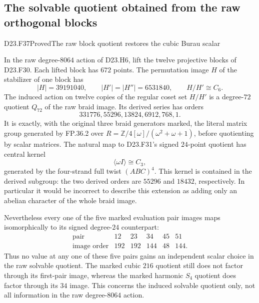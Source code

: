 \subsection{The solvable quotient obtained from the raw orthogonal blocks}

\begin{statement}{D23.F37}{Proved}{The raw block quotient restores the cubic Burau scalar}
\end{statement}
In the raw degree-$8064$ action of D23.H6, lift the twelve
projective blocks of D23.F30. Each lifted block has $672$ points.
The permutation image $H$ of the stabilizer of one block has
\[
 |H|=39191040,\qquad |H'|=|H''|=6531840,\qquad H/H'\cong C_6.
\]
The induced action on twelve copies of the regular coset set
$H/H'$ is a degree-$72$ quotient $Q_{72}$ of the raw braid image.
Its derived series has orders
\[
              331776,55296,13824,6912,768,1.
\]
It is exactly, with the original three braid generators marked,
the literal matrix group generated by FP.36.2 over
$R=\mathbb Z/4[\omega]/(\omega^2+\omega+1)$, before quotienting
by scalar matrices. The natural map to D23.F31's signed
$24$-point quotient has central kernel
\[
                      \langle\omega I\rangle\cong C_3,
\]
generated by the four-strand full twist $(ABC)^4$.
This kernel is contained in the derived subgroup: the two derived
orders are $55296$ and $18432$, respectively. In particular it
would be incorrect to describe this extension as adding only an
abelian character of the whole braid image.

Nevertheless every one of the five marked evaluation pair images
maps isomorphically to its signed degree-$24$ counterpart:
\[
\begin{array}{c|rrrrr}
\text{pair}&12&23&34&45&51\\\hline
\text{image order}&192&192&144&48&144.
\end{array}
\]
Thus no value at any one of these five pairs gains an independent
scalar choice in the raw solvable quotient. The marked cubic
$216$ quotient still does not factor through its first-pair image,
whereas the marked harmonic $S_4$ quotient does factor through
its $34$ image. This concerns the induced solvable quotient only,
not all information in the raw degree-$8064$ action.

